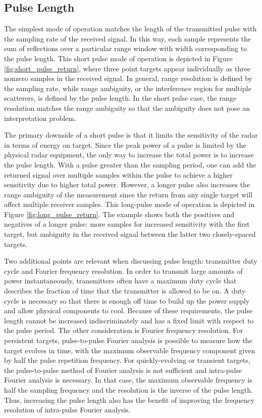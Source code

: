 \subsection{Pulse Length}
The simplest mode of operation matches the length of the transmitted pulse with the sampling rate of the received signal. In this way, each sample represents the sum of reflections over a particular range window with width corresponding to the pulse length. This short pulse mode of operation is depicted in Figure \ref{fig:short_pulse_return}, where three point targets appear individually as three nonzero samples in the received signal. In general, range resolution is defined by the sampling rate, while range ambiguity, or the interference region for multiple scatterers, is defined by the pulse length. In the short pulse case, the range resolution matches the range ambiguity so that the ambiguity does not pose an interpretation problem.

The primary downside of a short pulse is that it limits the sensitivity of the radar in terms of energy on target. Since the peak power of a pulse is limited by the physical radar equipment, the only way to increase the total power is to increase the pulse length. With a pulse greater than the sampling period, one can add the returned signal over multiple samples within the pulse to achieve a higher sensitivity due to higher total power. However, a longer pulse also increases the range ambiguity of the measurement since the return from any single target will affect multiple receiver samples. This long-pulse mode of operation is depicted in Figure \ref{fig:long_pulse_return}. The example shows both the positives and negatives of a longer pulse: more samples for increased sensitivity with the first target, but ambiguity in the received signal between the latter two closely-spaced targets.

Two additional points are relevant when discussing pulse length: transmitter duty cycle and Fourier frequency resolution. In order to transmit large amounts of power instantaneously, transmitters often have a maximum duty cycle that describes the fraction of time that the transmitter is allowed to be on. A duty cycle is necessary so that there is enough off time to build up the power supply and allow physical components to cool. Because of these requirements, the pulse length cannot be increased indiscriminately and has a fixed limit with respect to the pulse period. The other consideration is Fourier frequency resolution. For persistent targets, pulse-to-pulse Fourier analysis is possible to measure how the target evolves in time, with the maximum observable frequency component given by half the pulse repetition frequency. For quickly-evolving or transient targets, the pulse-to-pulse method of Fourier analysis is not sufficient and intra-pulse Fourier analysis is necessary. In that case, the maximum observable frequency is half the sampling frequency and the resolution is the inverse of the pulse length. Thus, increasing the pulse length also has the benefit of improving the frequency resolution of intra-pulse Fourier analysis.

